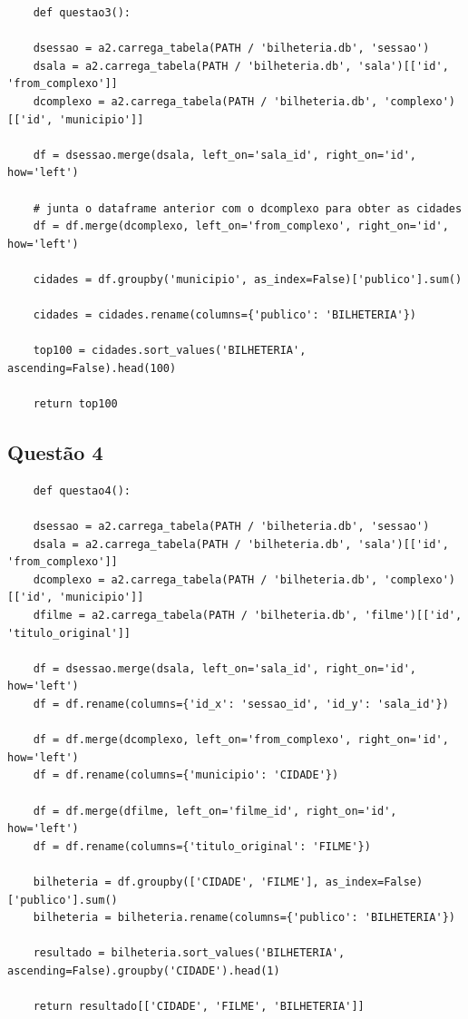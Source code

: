 \documentclass{article}
\begin{document}
\begin{lstlisting}
    def questao3():
    
    dsessao = a2.carrega_tabela(PATH / 'bilheteria.db', 'sessao')
    dsala = a2.carrega_tabela(PATH / 'bilheteria.db', 'sala')[['id', 'from_complexo']]
    dcomplexo = a2.carrega_tabela(PATH / 'bilheteria.db', 'complexo')[['id', 'municipio']]

    df = dsessao.merge(dsala, left_on='sala_id', right_on='id', how='left')

    # junta o dataframe anterior com o dcomplexo para obter as cidades
    df = df.merge(dcomplexo, left_on='from_complexo', right_on='id', how='left')

    cidades = df.groupby('municipio', as_index=False)['publico'].sum()

    cidades = cidades.rename(columns={'publico': 'BILHETERIA'})

    top100 = cidades.sort_values('BILHETERIA', ascending=False).head(100)

    return top100
\end{lstlisting}
\subsection*{Questão 4}
\begin{lstlisting}
    def questao4():
    
    dsessao = a2.carrega_tabela(PATH / 'bilheteria.db', 'sessao')
    dsala = a2.carrega_tabela(PATH / 'bilheteria.db', 'sala')[['id', 'from_complexo']]
    dcomplexo = a2.carrega_tabela(PATH / 'bilheteria.db', 'complexo')[['id', 'municipio']]
    dfilme = a2.carrega_tabela(PATH / 'bilheteria.db', 'filme')[['id', 'titulo_original']]

    df = dsessao.merge(dsala, left_on='sala_id', right_on='id', how='left')
    df = df.rename(columns={'id_x': 'sessao_id', 'id_y': 'sala_id'})  

    df = df.merge(dcomplexo, left_on='from_complexo', right_on='id', how='left')
    df = df.rename(columns={'municipio': 'CIDADE'})
    
    df = df.merge(dfilme, left_on='filme_id', right_on='id', how='left')
    df = df.rename(columns={'titulo_original': 'FILME'})

    bilheteria = df.groupby(['CIDADE', 'FILME'], as_index=False)['publico'].sum()
    bilheteria = bilheteria.rename(columns={'publico': 'BILHETERIA'})

    resultado = bilheteria.sort_values('BILHETERIA', ascending=False).groupby('CIDADE').head(1)

    return resultado[['CIDADE', 'FILME', 'BILHETERIA']]

\end{lstlisting}
\end{document}
